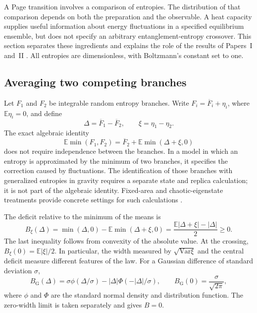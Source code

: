 \documentclass[11pt,letterpaper]{article}
\theoremstyle{plain}
\theoremstyle{definition}
\theoremstyle{remark}
\newcommand{\E}{\mathbb{E}}
\newcommand{\Var}{\text{Var}}
\begin{document}
A Page transition involves a comparison of entropies. The distribution of
that comparison depends on both the preparation and the observable. A
heat capacity supplies useful information about energy fluctuations in a
specified equilibrium ensemble, but does not specify an arbitrary
entanglement-entropy crossover. This section separates these ingredients
and explains the role of the results of Papers~I and~II
\cite{wuebben2026a,wuebben2026b}. All entropies are dimensionless, with
Boltzmann's constant set to one.

\subsection{Averaging two competing branches}

Let $F_1$ and $F_2$ be integrable random entropy branches. Write
$F_i=\overline F_i+\eta_i$, where $\E\eta_i=0$, and define
\begin{equation}
 \Delta=\overline F_1-\overline F_2,\qquad
 \xi=\eta_1-\eta_2.
 \label{eq04:branch_difference}
\end{equation}
The exact algebraic identity
\begin{equation}
 \E\min(F_1,F_2)=\overline F_2+\E\min(\Delta+\xi,0)
 \label{eq04:averaged_minimum}
\end{equation}
does not require independence between the branches. In a model in which
an entropy is approximated by the minimum of two branches, it specifies
the correction caused by fluctuations. The identification of those
branches with generalized entropies in gravity requires a separate
state and replica calculation; it is not part of the algebraic identity.
Fixed-area and chaotic-eigenstate treatments provide concrete settings
for such calculations \cite{marolfwangwang2020,murthysrednicki2019}.

The deficit relative to the minimum of the means is
\begin{equation}
 B_\xi(\Delta)
 =\min(\Delta,0)-\E\min(\Delta+\xi,0)
 =\frac{\E|\Delta+\xi|-|\Delta|}{2}\geq0.
 \label{eq04:deficit}
\end{equation}
The last inequality follows from convexity of the absolute value. At
the crossing, $B_\xi(0)=\E|\xi|/2$. In particular, the width measured by
$\sqrt{\Var\xi}$ and the central deficit measure different features of
the law. For a Gaussian difference of standard deviation $\sigma$,
\begin{equation}
 B_{\mathrm G}(\Delta)
 =\sigma\phi(\Delta/\sigma)
   -|\Delta|\Phi(-|\Delta|/\sigma),
 \qquad B_{\mathrm G}(0)=\frac{\sigma}{\sqrt{2\pi}},
 \label{eq04:gaussian}
\end{equation}
where $\phi$ and $\Phi$ are the standard normal density and distribution
function. The zero-width limit is taken separately and gives $B=0$.
\end{document}
